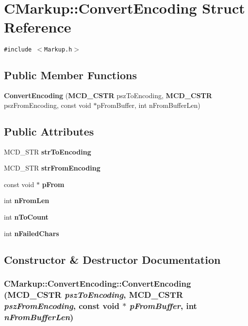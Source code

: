 \section{CMarkup::ConvertEncoding Struct Reference}
\label{structCMarkup_1_1ConvertEncoding}
{\tt \#include $<$Markup.h$>$}

\subsection*{Public Member Functions}
\begin{CompactItemize}
\item 
{\bf ConvertEncoding} ({\bf MCD\_\-CSTR} pszToEncoding, {\bf MCD\_\-CSTR} pszFromEncoding, const void $\ast$pFromBuffer, int nFromBufferLen)
\end{CompactItemize}
\subsection*{Public Attributes}
\begin{CompactItemize}
\item 
MCD\_\-STR {\bf strToEncoding}
\item 
MCD\_\-STR {\bf strFromEncoding}
\item 
const void $\ast$ {\bf pFrom}
\item 
int {\bf nFromLen}
\item 
int {\bf nToCount}
\item 
int {\bf nFailedChars}
\end{CompactItemize}


\subsection{Constructor \& Destructor Documentation}
\subsubsection[ConvertEncoding]{\setlength{\rightskip}{0pt plus 5cm}CMarkup::ConvertEncoding::ConvertEncoding ({\bf MCD\_\-CSTR} {\em pszToEncoding}, \/  {\bf MCD\_\-CSTR} {\em pszFromEncoding}, \/  const void $\ast$ {\em pFromBuffer}, \/  int {\em nFromBufferLen})\hspace{0.3cm}{\tt  [inline]}}\label{structCMarkup_1_1ConvertEncoding_52cfe3e75ff550c9ed4f4b472280192b}




